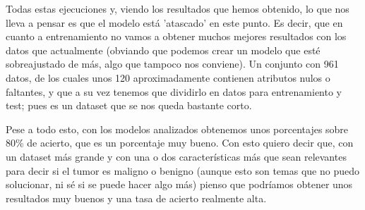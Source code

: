 \documentclass[11pt,a4paper]{article}
\begin{document}
Todas estas ejecuciones y, viendo los resultados que hemos obtenido, lo que nos lleva a pensar es que el modelo está 'atascado'
en este punto. Es decir, que en cuanto a entrenamiento no vamos a obtener muchos mejores resultados con los datos que actualmente
(obviando que podemos crear un modelo que esté sobreajustado de más, algo que tampoco nos conviene). Un conjunto con 961 datos,
de los cuales unos 120 aproximadamente contienen atributos nulos o faltantes, y que a su vez tenemos que dividirlo en datos
para entrenamiento y test; pues es un dataset que se nos queda bastante corto.

Pese a todo esto, con los modelos analizados obtenemos unos porcentajes sobre 80\% de acierto, que es un porcentaje muy bueno.
Con esto quiero decir que, con un dataset más grande y con una o dos características más que sean relevantes para decir si el
tumor es maligno o benigno (aunque esto son temas que no puedo solucionar, ni sé si se puede hacer algo más) pienso que
podríamos obtener unos resultados muy buenos y una tasa de acierto realmente alta.


\newpage
\end{document}
